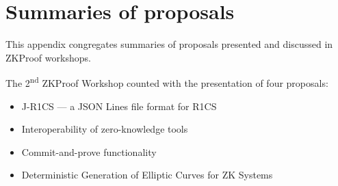 \chapter{Summaries of proposals}
\label{app:proposals}


This appendix congregates summaries of proposals presented and discussed in ZKProof workshops.

The 2\textsuperscript{nd} ZKProof Workshop counted with the presentation of four proposals:

\begin{itemize}
\item J-R1CS --- a JSON Lines file format for R1CS
\item Interoperability of zero-knowledge tools
\item Commit-and-prove functionality
\item Deterministic Generation of Elliptic Curves for ZK Systems
\end{itemize}







